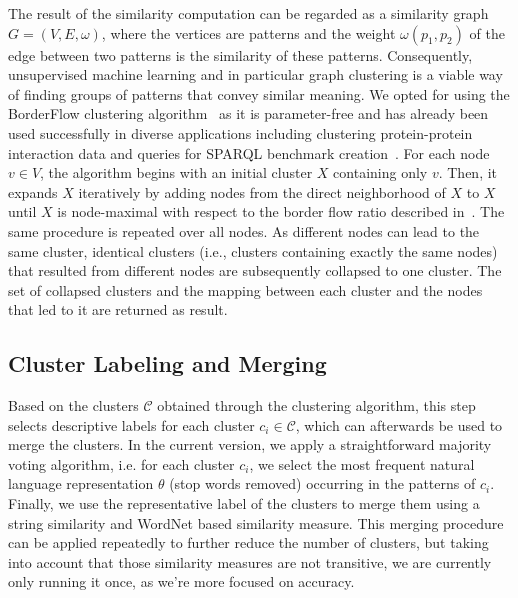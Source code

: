 \documentclass[a4paper]{llncs}
\begin{document}

The result of the similarity computation can be regarded as a similarity graph $G = (V, E, \omega)$, where the vertices are patterns and the weight $\omega(p_1, p_2)$ of the edge between two patterns is the similarity of these patterns. 
Consequently, unsupervised machine learning and in particular graph clustering is a viable way of finding groups of patterns that convey similar meaning.
We opted for using the BorderFlow clustering algorithm~\cite{DBLP:conf/cicling/NgomoS09} as it is parameter-free and has already been used successfully in diverse applications including clustering protein-protein interaction data and queries for SPARQL benchmark creation~\cite{DBLP:conf/semweb/MorseyLAN11}.
For each node $v \in V$, the algorithm begins with an initial cluster $X$ containing only $v$. 
Then, it expands $X$ iteratively by adding nodes from the direct neighborhood of $X$ to $X$ until $X$ is node-maximal with respect to the border flow ratio described in~\cite{DBLP:conf/semweb/MorseyLAN11}. 
The same procedure is repeated over all nodes. 
As different nodes can lead to the same cluster, identical clusters (i.e., clusters containing exactly the same nodes) that resulted from different nodes are subsequently collapsed to one cluster. 
The set of collapsed clusters and the mapping between each cluster and the nodes that led to it are returned as result.

\subsection{Cluster Labeling and Merging}
\label{subsec:cluster_labeling_and_merging}
Based on the clusters $\mathcal{C}$ obtained through the clustering algorithm, this step selects descriptive labels for each cluster $c_i\in\mathcal{C}$, which can afterwards be used to merge the clusters.
In the current version, we apply a straightforward majority voting algorithm, i.e. for each cluster $c_i$, we select the most frequent natural language representation $\theta$ (stop words removed) occurring in the patterns of $c_i$.
Finally, we use the representative label of the clusters to merge them using a string similarity and WordNet based similarity measure.
This merging procedure can be applied repeatedly to further reduce the number of clusters, but taking into account that those similarity measures are not transitive, we are currently only 
running it once, as we're more focused on accuracy.
\end{document}
